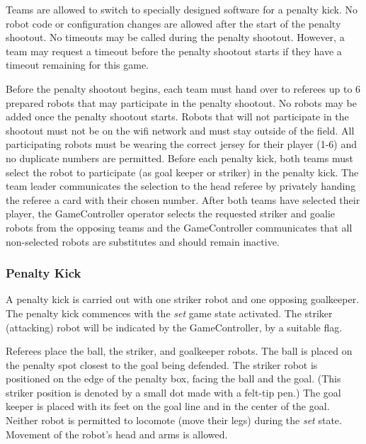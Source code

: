 \documentclass[12pt]{article}
\newcommand{\ie}{\mbox{i.\,e.}\xspace}
\begin{document}
Teams are allowed to switch to specially designed software for a penalty kick. No robot code or configuration changes are allowed after the start of the penalty shootout. No timeouts may be called during the penalty shootout. However, a team may request a timeout before the penalty shootout starts if they have a timeout remaining for this game.

Before the penalty shootout begins, each team must hand over to referees up to 6 prepared robots that may participate in the penalty shootout. No robots may be added once the penalty shootout starts. Robots that will not participate in the shootout must not be on the wifi network and must stay outside of the field. All participating robots must be wearing the correct jersey for their player (1-6) and no duplicate numbers are permitted. Before each penalty kick, both teams must select the robot to participate (as goal keeper or striker) in the penalty kick. The team leader communicates the selection to the head referee by privately handing the referee a card with their chosen number. After both teams have selected their player, the GameController operator selects the requested striker and goalie robots from the opposing teams and the GameController communicates that all non-selected robots are substitutes and should remain inactive.


\subsubsection{Penalty Kick}
\label{sec:penalty_kick}

A penalty kick is carried out with one striker robot and one opposing goalkeeper.
The penalty kick commences with the \textit{set} game state activated.
The striker (attacking) robot will be indicated by the GameController, by a suitable flag.

Referees place the ball, the striker, and goalkeeper robots. The ball is placed on the penalty spot closest to the goal being defended. The striker robot is positioned on the edge of the penalty box, facing the ball and the goal. (This striker position is denoted by a small dot made with a felt-tip pen.) The goal keeper is placed with its feet on the goal line and in the center of the goal.
Neither robot is permitted to locomote (move their legs) during the \textit{set} state. Movement of the robot's head and arms is allowed.
\end{document}
